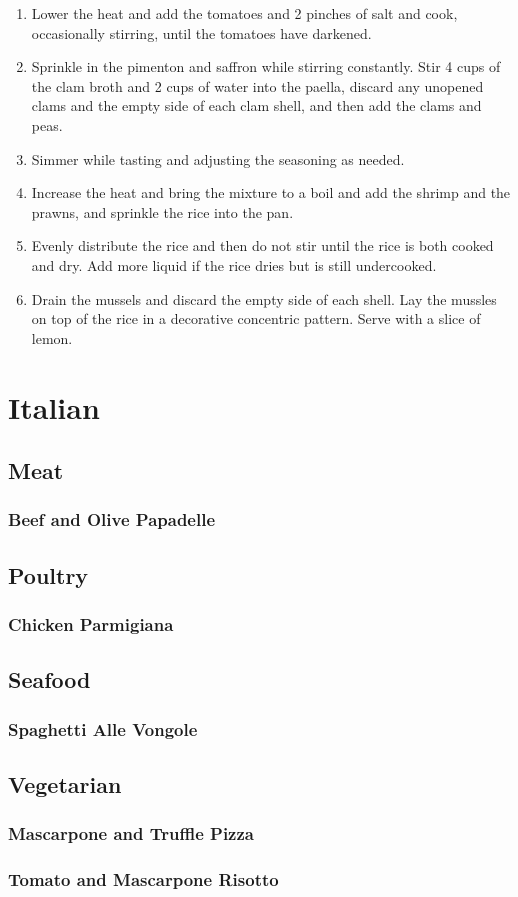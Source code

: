 \documentclass[a4paper, oneside]{book}
\begin{document}
\begin{multicols}{2}
{\begin{enumerate}
        \item
            Lower the heat and add the tomatoes and 2 pinches of salt
            and cook, occasionally stirring, until the tomatoes have darkened.
        \item
            Sprinkle in the pimenton and saffron while stirring constantly.
            Stir 4 cups of the clam broth and 2 cups of water into the paella,
            discard any unopened clams and the empty side of each clam shell,
            and then add the clams and peas.
        \item
            Simmer while tasting and adjusting the seasoning as needed.
        \item 
            Increase the heat and bring the mixture to a boil and add the
            shrimp and the prawns, and sprinkle the rice into the pan.
        \item
            Evenly distribute the rice and then do not stir until the rice
            is both cooked and dry. Add more liquid if the rice dries but is
            still undercooked.
        \item
            Drain the mussels and discard the empty side of each shell. Lay the
            mussles on top of the rice in a decorative concentric pattern.
            Serve with a slice of lemon.
    \end{enumerate}}

\end{multicols}

\chapter{Italian}
\section{Meat}
\subsection{Beef and Olive Papadelle}
\section{Poultry}
\subsection{Chicken Parmigiana}
\section{Seafood}
\subsection{Spaghetti Alle Vongole}
\section{Vegetarian}
\subsection{Mascarpone and Truffle Pizza}
\subsection{Tomato and Mascarpone Risotto}
\end{document}
